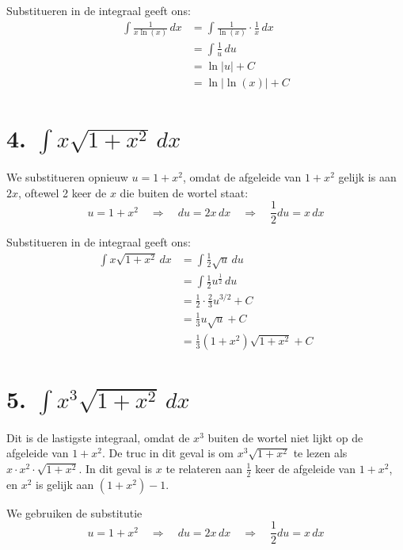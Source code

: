\documentclass[a4paper,12pt]{article}
\begin{document}
Substitueren in de integraal geeft ons:
\begin{align*}
    \int \frac{1}{x \ln(x)}\, dx    &= \int \frac{1}{\ln(x)} \cdot \frac{1}{x} \, dx \\
                                    &= \int \frac{1}{u}\, du \\
                                    &= \ln|u| + C \\
                                    &\boxed{= \ln|\ln(x)| + C}
\end{align*}

\section*{4. $\int x \sqrt{1 + x^2}\, dx$}

We substitueren opnieuw $u = 1 + x^2$, omdat de afgeleide van $1 + x^2$ gelijk is aan $2x$, oftewel 2 keer de $x$ die buiten de wortel staat:
\[
    u = 1 + x^2 \quad \Rightarrow \quad du = 2x\, dx \quad \Rightarrow \quad \frac{1}{2}du = x\, dx
\]

Substitueren in de integraal geeft ons:
\begin{align*}
    \int x \sqrt{1 + x^2}\, dx  &= \int \frac{1}{2} \sqrt{u}\, du\\
                                &= \int \frac{1}{2} u^{\frac{1}{2}}\, du \\
                                &= \frac{1}{2} \cdot \frac{2}{3} u^{3/2} + C \\
                                &= \frac{1}{3} u \sqrt{u} + C \\
                                &\boxed{= \frac{1}{3} (1 + x^2) \sqrt{1 + x^2} + C}
\end{align*}

\section*{5. $\int x^3 \sqrt{1 + x^2}\, dx$}

Dit is de lastigste integraal, omdat de $x^3$ buiten de wortel niet lijkt op de afgeleide van $1 + x^2$.
De truc in dit geval is om $x^3 \sqrt{1 + x^2}$ te lezen als $x \cdot x^2 \cdot \sqrt{1+x^2}$.
In dit geval is $x$ te relateren aan $\frac{1}{2}$ keer de afgeleide van $1 + x^2$, en $x^2$ is gelijk aan $(1+x^2) - 1$.

We gebruiken de substitutie
\[
    u = 1 + x^2 \quad \Rightarrow \quad du = 2x\, dx \quad \Rightarrow \quad \frac{1}{2}du = x\, dx
\]
\end{document}
